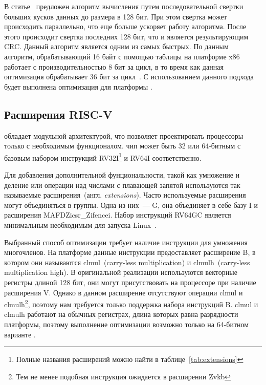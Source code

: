 В статье~\cite{gopal2009fast} предложен алгоритм вычисления \crctt{} путем последовательной свертки больших кусков данных до размера в 128 бит.
При этом свертка может происходить параллельно, что еще больше ускоряет работу алгоритма.
После этого происходит свертка последних 128 бит, что и является результирующим CRC.
Данный алгоритм является одним из самых быстрых.
По данным~\cite{fastestCRC32} алгоритм, обрабатывающий 16 байт с помощью таблицы на платформе x86 работает с производительностью 8 бит за цикл, в то время как данная оптимизация обрабатывает 36 бит за цикл~\cite{intelPerf}.
С использованием данного подхода будет выполнена оптимизация для платформы \riscv{}.


\subsection{Расширения RISC-V}
\riscv{} обладает модульной архитектурой, что позволяет проектировать процессоры только с необходимым функционалом.
\riscv{} чип может быть 32 или 64-битным с базовым набором инструкций \textenglish{RV32I}\footnote{Полные названия расширений можно найти в таблице~\ref{tab:extensions}} и \textenglish{RV64I} соответственно.

Для добавления дополнительной фунциональности, такой как умножение и деление или операции над числами с плавающей запятой используются так называемые расширения~(англ. \textenglish{\textit{extensions}}).
Часто используемые расширения могут объединяться в группы.
Одна из них~--- G, она объединяет в себе базу I и расширения MAFDZicsr\_Zifencei.
Набор инструкций RV64GC является минимальным необходимым для запуска Linux~\cite{debwiki:riscv}.

Выбранный способ оптимизации требует наличие инструкции для умножения многочленов.
На платформе \riscv{} данные инструкции предоставляет расширение B, в котором они называются \textenglish{clmul~(carry-less multiplication)} и \textenglish{clmulh~(carry-less multiplication high)}.
В оригинальной реализации используются векторные регистры длиной 128 бит, они могут присутствовать на процессоре \riscv{} при наличие расширения V.
Однако в данном расширение отсутствуют операции clmul и clmulh\footnote{Тем не менее подобная инструкция ожидается в расширении Zvkb}, поэтому нам требуется только поддержка набора инструкций B.
\textenglish{clmul} и \textenglish{clmulh} работают на обычных регистрах, длина которых равна разрядности платформы, поэтому выполнение оптимизации возможно только на 64-битном варианте \riscv{}.

